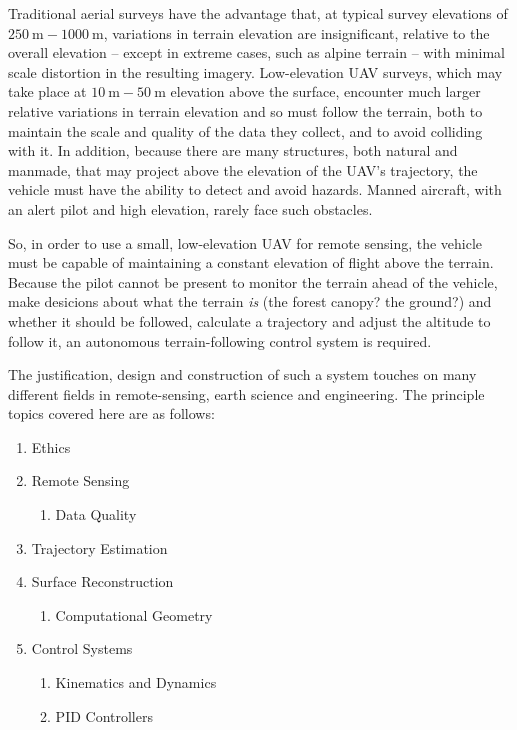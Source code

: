 \documentclass[10pt]{article}
\begin{document}
Traditional aerial surveys have the advantage that, at typical survey elevations of $\SI{250}\m-\SI{1000}\m$, variations in terrain elevation are insignificant, relative to the overall elevation -- except in extreme cases, such as alpine terrain -- with minimal scale distortion in the resulting imagery. Low-elevation UAV surveys, which may take place at $\SI{10}\m-\SI{50}\m$ elevation above the surface, encounter much larger relative variations in terrain elevation and so must follow the terrain, both to maintain the scale and quality of the data they collect, and to avoid colliding with it. In addition, because there are many structures, both natural and manmade, that may project above the elevation of the UAV's trajectory, the vehicle must have the ability to detect and avoid hazards. Manned aircraft, with an alert pilot and high elevation, rarely face such obstacles.

So, in order to use a small, low-elevation UAV for remote sensing, the vehicle must be capable of maintaining a constant elevation of flight above the terrain. Because the pilot cannot be present to monitor the terrain ahead of the vehicle, make desicions about what the terrain \emph{is} (the forest canopy? the ground?) and whether it should be followed, calculate a trajectory and adjust the altitude to follow it, an autonomous terrain-following control system is required.

The justification, design and construction of such a system touches on many different fields in remote-sensing, earth science and engineering. The principle topics covered here are as follows:

\begin{enumerate}
\item Ethics
\item Remote Sensing
\begin{enumerate}
\item Data Quality
\end{enumerate}
\item Trajectory Estimation
\item Surface Reconstruction
	\begin{enumerate}
	\item Computational Geometry
	\end{enumerate}
\item Control Systems
	\begin{enumerate}
	\item Kinematics and Dynamics
	\item PID Controllers
	\end{enumerate}
\end{enumerate}
\end{document}
